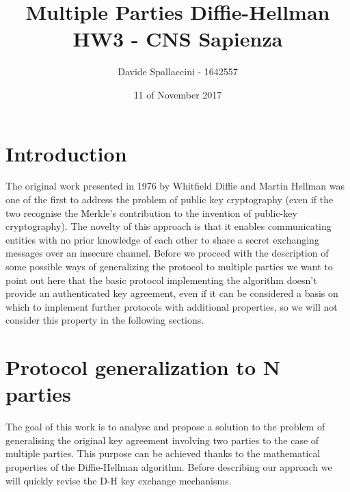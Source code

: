 \documentclass[11pt]{article}
\begin{document}
\title{Multiple Parties Diffie-Hellman\\ HW3 - CNS Sapienza}
\author{Davide Spallaccini - 1642557}
\date{11 of November 2017}
\maketitle

\section{Introduction}
The original work presented in 1976 by Whitfield Diffie and Martin Hellman \cite{original_dh} was one of the first to address the problem of public key cryptography (even if the two recognise the Merkle's contribution to the invention of public-key cryptography). The novelty of this approach is that it enables communicating entities with no prior knowledge of each other to share a secret exchanging messages over an insecure channel. Before we proceed with the description of some possible ways of generalizing the protocol to multiple parties we want to point out here that the basic protocol implementing the algorithm doesn't provide an authenticated key agreement, even if it can be considered a basis on which to implement further protocols with additional properties, so we will not consider this property in the following sections.

\section{Protocol generalization to N parties}
The goal of this work is to analyse and propose a solution to the problem of generalising the original key agreement involving two parties to the case of multiple parties. This purpose can be achieved thanks to the mathematical properties of the Diffie-Hellman algorithm. Before describing our approach we will quickly revise the D-H key exchange mechanisms.
\end{document}
